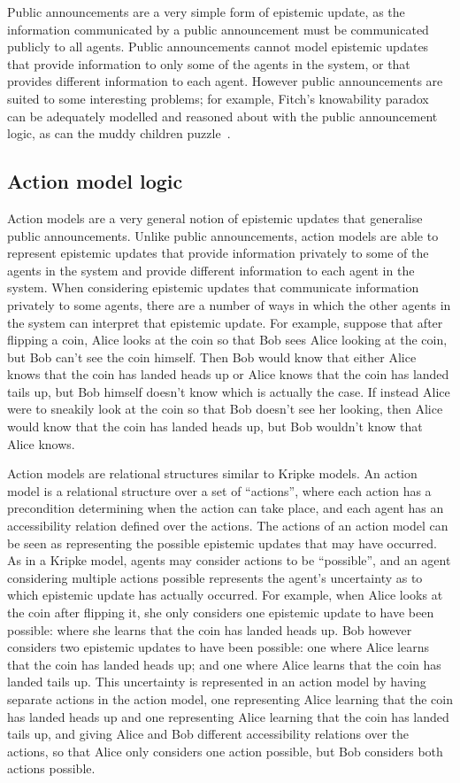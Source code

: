 Public announcements are a very simple form of epistemic update, as the information communicated by a public announcement must be communicated publicly to all agents.
Public announcements cannot model epistemic updates that provide information to only some of the agents in the system, or that provides different information to each agent.
However public announcements are suited to some interesting problems; for example, Fitch's knowability paradox~\cite{fitch:1963} can be adequately modelled and reasoned about with the public announcement logic, as can the muddy children puzzle~\cite{barwise:1981, vanditmarsch:2007}.

\subsection{Action model logic}

Action models are a very general notion of epistemic updates that generalise public announcements.
Unlike public announcements, action models are able to represent epistemic updates that provide information privately to some of the agents in the system and provide different information to each agent in the system.
When considering epistemic updates that communicate information privately to some agents, there are a number of ways in which the other agents in the system can interpret that epistemic update. 
For example, suppose that after flipping a coin, Alice looks at the coin so that Bob sees Alice looking at the coin, but Bob can't see the coin himself. Then Bob would know that either Alice knows that the coin has landed heads up or Alice knows that the coin has landed tails up, but Bob himself doesn't know which is actually the case.
If instead Alice were to sneakily look at the coin so that Bob doesn't see her looking, then Alice would know that the coin has landed heads up, but Bob wouldn't know that Alice knows.

Action models are relational structures similar to Kripke models.
An action model is a relational structure over a set of ``actions'', where each action has a precondition determining when the action can take place, and each agent has an accessibility relation defined over the actions.
The actions of an action model can be seen as representing the possible epistemic updates that may have occurred.
As in a Kripke model, agents may consider actions to be ``possible'', and an agent considering multiple actions possible represents the agent's uncertainty as to which epistemic update has actually occurred.
For example, when Alice looks at the coin after flipping it, she only considers one epistemic update to have been possible: where she learns that the coin has landed heads up.
Bob however considers two epistemic updates to have been possible: one where Alice learns that the coin has landed heads up; and one where Alice learns that the coin has landed tails up.
This uncertainty is represented in an action model by having separate actions in the action model, one representing Alice learning that the coin has landed heads up and one representing Alice learning that the coin has landed tails up, and giving Alice and Bob different accessibility relations over the actions, so that Alice only considers one action possible, but Bob considers both actions possible.

